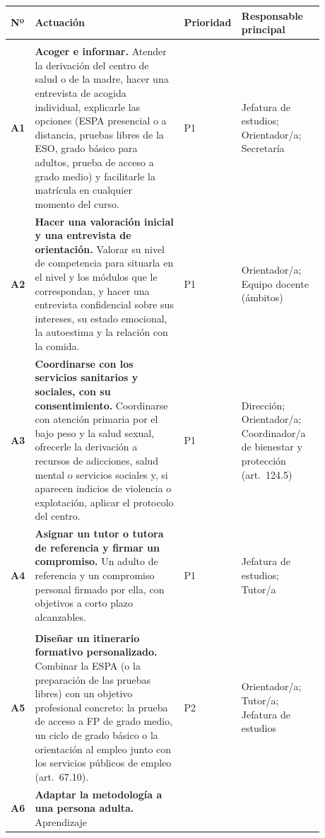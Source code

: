 \documentclass[11pt,a4paper]{article}
\newcommand{\prio}[1]{\textbf{\color{acento}#1}}
\begin{document}
{\small
\renewcommand{\arraystretch}{1.25}
\begin{longtable}{>{\bfseries}p{0.06\linewidth} p{0.47\linewidth} >{\centering\arraybackslash}p{0.09\linewidth} >{\raggedright\arraybackslash}p{0.26\linewidth}}
\toprule
Nº & Actuación & Prioridad & Responsable principal \\
\midrule
\endhead
\multicolumn{4}{l}{\prio{P1 --- Inmediata (urgente e importante)}}\\
A1 & \textbf{Acoger e informar.} Atender la derivación del centro de salud o de
la madre, hacer una entrevista de acogida individual, explicarle las opciones
(ESPA presencial o a distancia, pruebas libres de la ESO, grado básico para
adultos, prueba de acceso a grado medio) y facilitarle la matrícula en cualquier
momento del curso. & P1 & Jefatura de estudios; Orientador/a; Secretaría \\
A2 & \textbf{Hacer una valoración inicial y una entrevista de orientación.}
Valorar su nivel de competencia para situarla en el nivel y los módulos que le
correspondan, y hacer una entrevista confidencial sobre sus intereses, su
estado emocional, la autoestima y la relación con la comida. & P1 &
Orientador/a; Equipo docente (ámbitos) \\
A3 & \textbf{Coordinarse con los servicios sanitarios y sociales, con su
consentimiento.} Coordinarse con atención primaria por el bajo peso y la salud
sexual, ofrecerle la derivación a recursos de adicciones, salud mental o
servicios sociales y, si aparecen indicios de violencia o explotación, aplicar
el protocolo del centro. & P1 & Dirección; Orientador/a; Coordinador/a de
bienestar y protección (art.~124.5) \\
A4 & \textbf{Asignar un tutor o tutora de referencia y firmar un compromiso.}
Un adulto de referencia y un compromiso personal firmado por ella, con
objetivos a corto plazo alcanzables. & P1 & Jefatura de estudios; Tutor/a \\
\midrule
\multicolumn{4}{l}{\prio{P2 --- Corto plazo (importante, con plazo)}}\\
A5 & \textbf{Diseñar un itinerario formativo personalizado.} Combinar la ESPA
(o la preparación de las pruebas libres) con un objetivo profesional concreto:
la prueba de acceso a FP de grado medio, un ciclo de grado básico o la
orientación al empleo junto con los servicios públicos de empleo (art.~67.10).
& P2 & Orientador/a; Tutor/a; Jefatura de estudios \\
A6 & \textbf{Adaptar la metodología a una persona adulta.} Aprendizaje

\end{longtable}}
\end{document}
